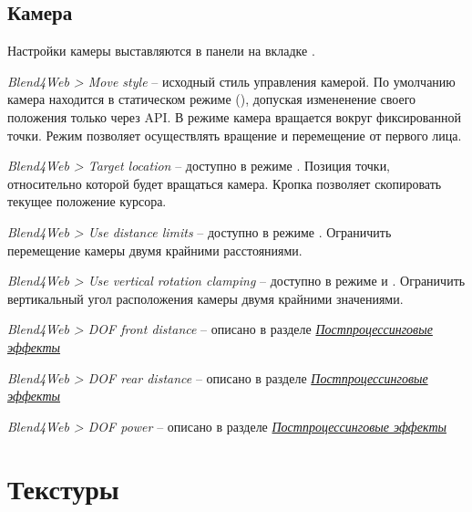 \documentclass[a4paper,12pt,oneside]{sphinxmanual}
\begin{document}
\section{Камера}
\label{objects:id5}
Настройки камеры выставляются в панели  на вкладке .

\emph{Blend4Web \textgreater{} Move style} -- исходный стиль управления камерой. По умолчанию камера
находится в статическом режиме (), допуская измененение своего
положения только через API. В режиме  камера вращается вокруг
фиксированной точки. Режим  позволяет осуществлять вращение и перемещение от первого
лица.

\emph{Blend4Web \textgreater{} Target location} -- доступно в режиме . Позиция точки,
относительно которой будет вращаться камера. Кропка 
позволяет скопировать текущее положение курсора.

\emph{Blend4Web \textgreater{} Use distance limits} -- доступно в режиме . Ограничить
перемещение камеры двумя крайними расстояниями.

\emph{Blend4Web \textgreater{} Use vertical rotation clamping} -- доступно в режиме  и .
Ограничить вертикальный угол расположения камеры двумя крайними значениями.

\emph{Blend4Web \textgreater{} DOF front distance} -- описано в разделе {\hyperref[postprocessing_effects:postprocessing-effects]{\emph{Постпроцессинговые эффекты}}}

\emph{Blend4Web \textgreater{} DOF rear distance} -- описано в разделе {\hyperref[postprocessing_effects:postprocessing-effects]{\emph{Постпроцессинговые эффекты}}}

\emph{Blend4Web \textgreater{} DOF power} -- описано в разделе {\hyperref[postprocessing_effects:postprocessing-effects]{\emph{Постпроцессинговые эффекты}}}
\label{textures:textures}

\chapter{Текстуры}
\label{textures:index-0}\label{textures::doc}\label{textures:id1}
\end{document}
